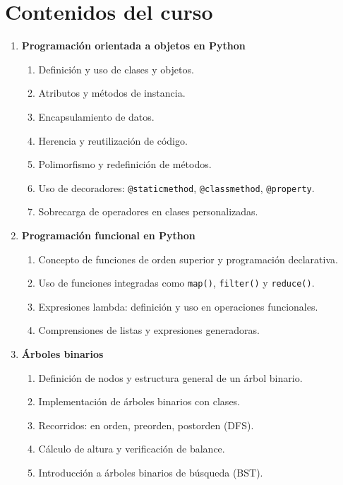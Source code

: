 \section{Contenidos del curso}

\begin{enumerate}

  \item \textbf{Programación orientada a objetos en Python}

  \begin{enumerate}
    \item \label{itm:1.1} Definición y uso de clases y objetos.
    \item \label{itm:1.2} Atributos y métodos de instancia.
    \item \label{itm:1.3} Encapsulamiento de datos.
    \item \label{itm:1.4} Herencia y reutilización de código.
    \item \label{itm:1.5} Polimorfismo y redefinición de métodos.
    \item \label{itm:1.6} Uso de decoradores: \texttt{@staticmethod}, \texttt{@classmethod}, \texttt{@property}.
    \item \label{itm:1.7} Sobrecarga de operadores en clases personalizadas.
  \end{enumerate}

  \item \textbf{Programación funcional en Python}

  \begin{enumerate}
    \item \label{itm:2.1} Concepto de funciones de orden superior y programación declarativa.
    \item \label{itm:2.2} Uso de funciones integradas como \texttt{map()}, \texttt{filter()} y \texttt{reduce()}.
    \item \label{itm:2.3} Expresiones lambda: definición y uso en operaciones funcionales.
    \item \label{itm:2.4} Comprensiones de listas y expresiones generadoras.
  \end{enumerate}

  \item \textbf{Árboles binarios}

  \begin{enumerate}
    \item \label{itm:3.1} Definición de nodos y estructura general de un árbol binario.
    \item \label{itm:3.2} Implementación de árboles binarios con clases.
    \item \label{itm:3.3} Recorridos: en orden, preorden, postorden (DFS).
    \item \label{itm:3.4} Cálculo de altura y verificación de balance.
    \item \label{itm:3.5} Introducción a árboles binarios de búsqueda (BST).
  \end{enumerate}


\end{enumerate}
